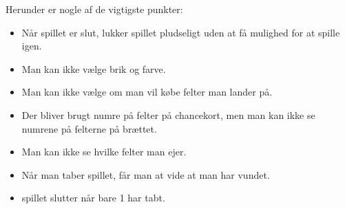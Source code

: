 Herunder er nogle af de vigtigste punkter:
\begin{itemize}
\item Når spillet er slut, lukker spillet pludseligt uden at få mulighed for at spille igen.
\item Man kan ikke vælge brik og farve.
\item Man kan ikke vælge om man vil købe felter man lander på.
\item Der bliver brugt numre på felter på chancekort, men man kan ikke se numrene på felterne på brættet.
\item Man kan ikke se hvilke felter man ejer.
\item Når man taber spillet, får man at vide at man har vundet. 
\item spillet slutter når bare 1 har tabt.
\end{itemize}

